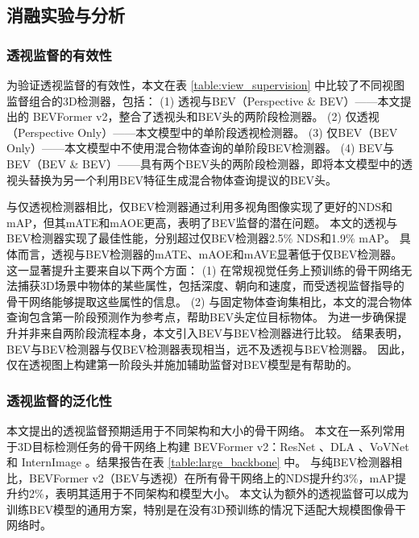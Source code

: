 


\subsection{消融实验与分析}
\subsubsection{透视监督的有效性}
为验证透视监督的有效性，本文在表 \ref{table:view_supervision} 中比较了不同视图监督组合的3D检测器，包括：
(1) 透视与BEV（Perspective \& BEV）——本文提出的 BEVFormer v2，整合了透视头和BEV头的两阶段检测器。
(2) 仅透视（Perspective Only）——本文模型中的单阶段透视检测器。
(3) 仅BEV（BEV Only）——本文模型中不使用混合物体查询的单阶段BEV检测器。
(4) BEV与BEV（BEV \& BEV）——具有两个BEV头的两阶段检测器，即将本文模型中的透视头替换为另一个利用BEV特征生成混合物体查询提议的BEV头。

与仅透视检测器相比，仅BEV检测器通过利用多视角图像实现了更好的NDS和mAP，但其mATE和mAOE更高，表明了BEV监督的潜在问题。
本文的透视与BEV检测器实现了最佳性能，分别超过仅BEV检测器2.5\% NDS和1.9\% mAP。
具体而言，透视与BEV检测器的mATE、mAOE和mAVE显著低于仅BEV检测器。
这一显著提升主要来自以下两个方面：
(1) 在常规视觉任务上预训练的骨干网络无法捕获3D场景中物体的某些属性，包括深度、朝向和速度，而受透视监督指导的骨干网络能够提取这些属性的信息。
(2) 与固定物体查询集相比，本文的混合物体查询包含第一阶段预测作为参考点，帮助BEV头定位目标物体。
为进一步确保提升并非来自两阶段流程本身，本文引入BEV与BEV检测器进行比较。
结果表明，BEV与BEV检测器与仅BEV检测器表现相当，远不及透视与BEV检测器。
因此，仅在透视图上构建第一阶段头并施加辅助监督对BEV模型是有帮助的。

\subsubsection{透视监督的泛化性}
本文提出的透视监督预期适用于不同架构和大小的骨干网络。
本文在一系列常用于3D目标检测任务的骨干网络上构建 BEVFormer v2：ResNet \cite{ResNet}、DLA \cite{DLA}、VoVNet \cite{Vovnet} 和 InternImage \cite{InternImage}。结果报告在表 \ref{table:large_backbone} 中。
与纯BEV检测器相比，BEVFormer v2（BEV与透视）在所有骨干网络上的NDS提升约3\%，mAP提升约2\%，表明其适用于不同架构和模型大小。
本文认为额外的透视监督可以成为训练BEV模型的通用方案，特别是在没有3D预训练的情况下适配大规模图像骨干网络时。

